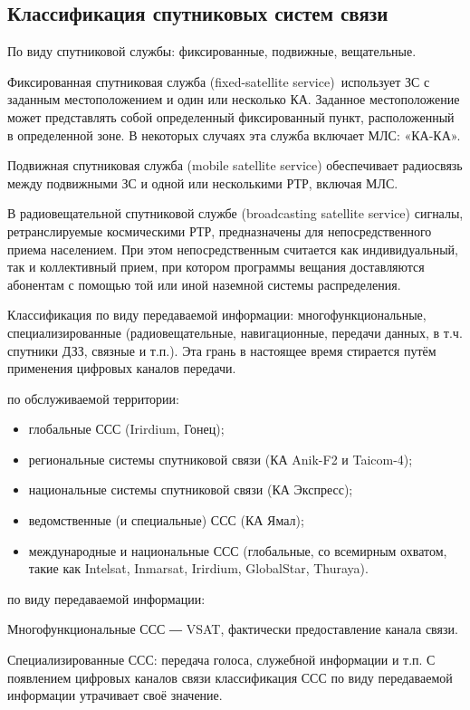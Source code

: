 \documentclass[14pt,a4paper,oneside]{extarticle}
\begin{document}
\subsection{Классификация спутниковых систем связи}

По виду спутниковой службы: фиксированные, подвижные, вещательные.

Фиксированная спутниковая служба (fixed-satellite service) использует ЗС с заданным местоположением и один или несколько КА. Заданное местоположение может представлять собой определенный фиксированный пункт, расположенный в определенной зоне. В некоторых случаях эта служба включает МЛС: «КА-КА».

Подвижная спутниковая служба (mobile satellite service)  обеспечивает радиосвязь между подвижными ЗС и одной или несколькими РТР, включая МЛС.

В радиовещательной спутниковой службе (broadcasting satellite service) сигналы, ретранслируемые космическими РТР, предназначены для непосредственного приема населением. При этом непосредственным считается как индивидуальный, так и коллективный прием, при котором программы вещания доставляются абонентам с помощью той или иной наземной системы распределения.

Классификация по виду передаваемой информации: многофункциональные, специализированные (радиовещательные, навигационные, передачи данных, в т.ч. спутники ДЗЗ, связные и т.п.). Эта грань в настоящее время стирается путём применения цифровых каналов передачи.

по обслуживаемой территории:

\begin{itemize}
    \item глобальные ССС (Irirdium, Гонец);
    \item региональные системы спутниковой связи (КА Anik-F2 и Taicom-4);
    \item национальные системы спутниковой связи (КА Экспресс);
    \item ведомственные (и специальные) ССС (КА Ямал);
    \item международные и национальные ССС (глобальные, со всемирным охватом, такие как Intelsat, Inmarsat, Irirdium, GlobalStar, Thuraya).
\end{itemize}

по виду передаваемой информации:

Многофункциональные ССС ― VSAT, фактически предоставление канала связи.

Специализированные ССС: передача голоса, служебной информации и т.п. С появлением цифровых каналов связи классификация ССС по виду передаваемой информации  утрачивает своё значение.
\end{document}

